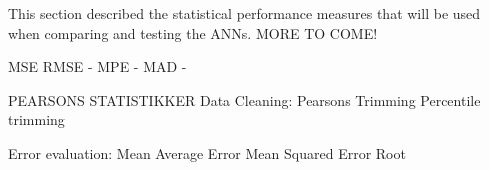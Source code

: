 This section described the statistical performance measures that will be used when comparing and testing the ANNs. MORE TO COME!

MSE 
RMSE - 
MPE - 
MAD -

PEARSONS
STATISTIKKER
	Data Cleaning:
		Pearsons
		Trimming
		Percentile trimming

	Error evaluation:
		Mean Average Error
		Mean Squared Error
		Root 

